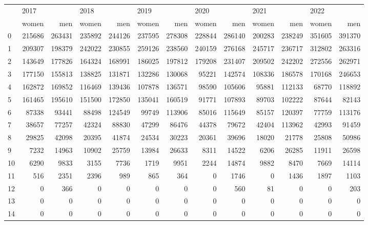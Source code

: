 \begin{tabular}{lrrrrrrrrrrrr}
\toprule
{} & \multicolumn{2}{l}{2017} & \multicolumn{2}{l}{2018} & \multicolumn{2}{l}{2019} & \multicolumn{2}{l}{2020} & \multicolumn{2}{l}{2021} & \multicolumn{2}{l}{2022} \\
{} &   women &     men &   women &     men &   women &     men &   women &     men &   women &     men &   women &     men \\
\midrule
0  &  215686 &  263431 &  235892 &  244126 &  237595 &  278308 &  228844 &  286140 &  200283 &  238249 &  351605 &  391370 \\
1  &  209307 &  198379 &  242022 &  230855 &  259126 &  238560 &  240159 &  276168 &  245717 &  236717 &  312802 &  263316 \\
2  &  143649 &  177826 &  164324 &  168991 &  186025 &  197812 &  179208 &  231407 &  209502 &  242202 &  272556 &  262971 \\
3  &  177150 &  155813 &  138825 &  131871 &  132286 &  130068 &   95221 &  142574 &  108336 &  186578 &  170168 &  246653 \\
4  &  162872 &  169852 &  116469 &  139436 &  107878 &  136571 &   98590 &  105606 &   95881 &  112133 &   68770 &  118892 \\
5  &  161465 &  195610 &  151500 &  172850 &  135041 &  160519 &   91771 &  107893 &   89703 &  102222 &   87644 &   82143 \\
6  &   87338 &   93441 &   88498 &  124549 &   99749 &  113906 &   85016 &  115649 &   85157 &  120397 &   77759 &  113176 \\
7  &   38657 &   77257 &   42324 &   88830 &   47299 &   86476 &   44378 &   79672 &   42404 &  113962 &   42993 &   91459 \\
8  &   29825 &   42098 &   20395 &   41874 &   24534 &   30223 &   20361 &   39696 &   18020 &   21778 &   25808 &   50986 \\
9  &    7232 &   14963 &   10902 &   25759 &   13984 &   26633 &    8311 &   14522 &    6206 &   26285 &   11911 &   26598 \\
10 &    6290 &    9833 &    3155 &    7736 &    1719 &    9951 &    2244 &   14874 &    9882 &    8470 &    7669 &   14114 \\
11 &     516 &    2351 &    2396 &     989 &     865 &     364 &       0 &    1746 &       0 &    1436 &    1897 &    1103 \\
12 &       0 &     366 &       0 &       0 &       0 &       0 &       0 &     560 &      81 &       0 &       0 &     203 \\
13 &       0 &       0 &       0 &       0 &       0 &       0 &       0 &       0 &       0 &       0 &       0 &       0 \\
14 &       0 &       0 &       0 &       0 &       0 &       0 &       0 &       0 &       0 &       0 &       0 &       0 \\
\bottomrule
\end{tabular}
